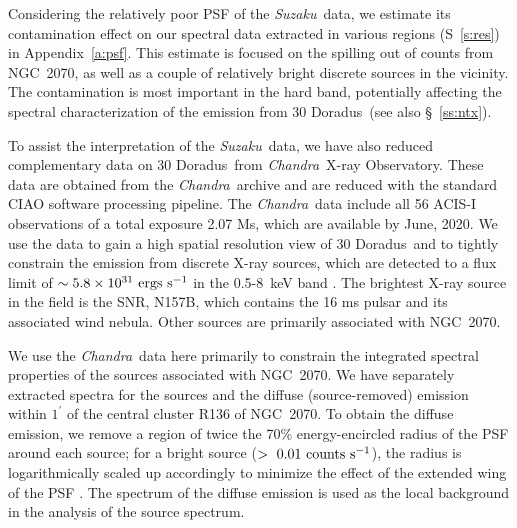 \documentclass[usenatbib]{mnras}
\def\xs{30 Doradus}
\def\suzaku{{\sl Suzaku}}
\def\chandra{{\sl Chandra}}
\begin{document}

Considering the relatively poor PSF of the \suzaku\ data, we estimate its contamination effect on our spectral data extracted in various regions (S~\ref{s:res}) in Appendix~\ref{a:psf}. This estimate is focused on the spilling out of counts from NGC~2070, as well as a couple of relatively bright discrete sources in the vicinity. The contamination is most important in the hard band, potentially affecting the spectral characterization of the emission from \xs\ (see also \S~\ref{ss:ntx}).

To assist the interpretation of the \suzaku\ data, we have also reduced complementary data on \xs\ from \chandra\   X-ray Observatory. These data are obtained from the 
\chandra\ archive and are reduced with the standard CIAO software processing pipeline. The \chandra\ data include all 56 ACIS-I observations of a total exposure 2.07 Ms, which are available by June, 2020. We use the data to gain a high spatial resolution view of \xs\ and to tightly constrain the emission from discrete X-ray sources, which are detected to a flux limit of $\sim 5.8 \times 10^{31} {\rm~ergs~s^{-1}}$ in the 0.5-8~keV band \citep{wang04}. The brightest X-ray source in the field is the SNR, N157B, which contains the 16 ms pulsar and its associated wind nebula. Other sources are primarily associated with NGC~2070.

We use  the \chandra\ data here primarily to constrain the integrated spectral properties of the sources associated with NGC~2070. We have separately extracted spectra for the sources and the diffuse (source-removed) emission within $1^\prime$ of the central cluster R136 of NGC~2070. To obtain the diffuse emission, we remove a region of twice the 70\% energy-encircled radius of the PSF around each source; for a bright source ($>~0.01 \rm~counts~s^{-1}$), the radius is logarithmically scaled up accordingly to minimize the effect of the extended wing of the PSF \citep{wang04}. 
The spectrum of the diffuse emission is used as the local background in the analysis of the  source spectrum.
\end{document}
